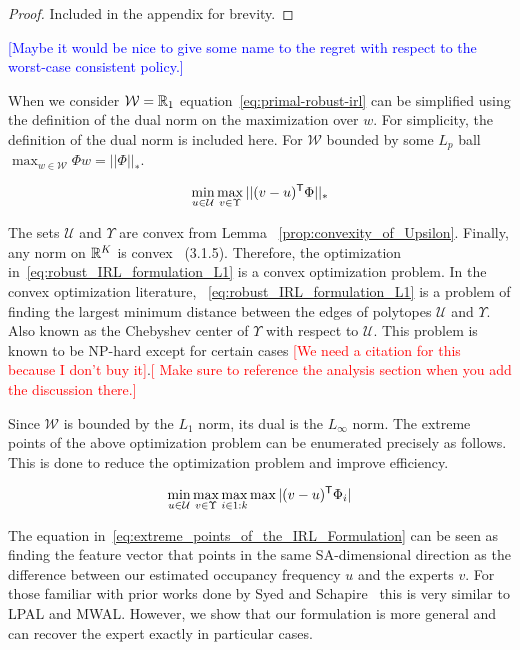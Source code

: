 \documentclass[11pt]{uai2023}
\newcommand{\mm}[1]{\textcolor{blue}{[#1]}}
\newcommand{\gersi}[1]{\textcolor{red}{[#1]}}
\begin{document}
\begin{proof}
	Included in the appendix for brevity.
\end{proof}

\mm{Maybe it would be nice to give some name to the regret with respect to the worst-case consistent policy.}

When we consider $\mathcal{W} = \mathbb{R}_{1}$ equation~\eqref{eq:primal-robust-irl} can be simplified using the definition of the dual norm on the maximization
over $w$. For simplicity, the definition of the dual norm is included here. For $\mathcal{W}$ bounded by some $L_p$ ball $\max_{w \in \mathcal{W}} \Phi w = ||\Phi||_*$.

\begin{equation}
	\label{eq:robust_IRL_formulation_L1}
	\min_{u \in \mathcal{U}} \max_{v \in \Upsilon} ||(v - u)^{\mathsf{T}} \Phi||_*
\end{equation}

The sets $\mathcal{U}$ and $\Upsilon$ are convex from Lemma ~\ref{prop:convexity_of_Upsilon}.
Finally, any norm on $\mathbb{R}^K$ is convex~\cite{boyd_convex_optimization} (3.1.5).
Therefore, the optimization in~\eqref{eq:robust_IRL_formulation_L1} is a convex
optimization problem. In the convex optimization literature,
~\eqref{eq:robust_IRL_formulation_L1} is a problem of finding the largest minimum
distance between the edges of polytopes $\mathcal{U}$ and $\Upsilon$. Also known as the Chebyshev center of $\Upsilon$ with respect to $\mathcal{U}$.
This problem is known to be NP-hard except for certain cases \gersi{We need a
	citation for this because I don't buy it}.\gersi{ Make sure to reference the analysis section when you add the discussion there.}

Since $\mathcal{W}$ is bounded by the $L_1$ norm, its dual is the $L_\infty$ norm. The extreme points of the above
optimization problem can be enumerated precisely as follows.
This is done to reduce the optimization problem and improve efficiency.

\begin{equation}
	\label{eq:extreme_points_of_the_IRL_Formulation}
	\min_{u \in \mathcal{U}} \max_{v \in \Upsilon} \max_{i \in 1:k} \max|(v - u)^{\mathsf{T}} \Phi_i|
\end{equation}

The equation in~\eqref{eq:extreme_points_of_the_IRL_Formulation} can be seen as
finding the feature vector that points in the same SA-dimensional direction as
the difference between our estimated occupancy frequency $u$ and the experts
$v$. For those familiar with prior works done by Syed and Schapire~\cite{Syed2008} this is very similar to LPAL and MWAL.
However, we show that our formulation is more general and can recover the expert exactly in particular cases.
\end{document}
